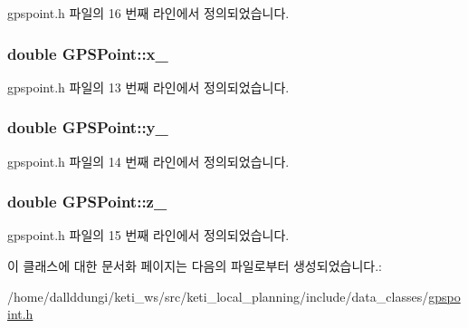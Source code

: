 gpspoint.\+h 파일의 16 번째 라인에서 정의되었습니다.

\subsubsection[{\texorpdfstring{x\+\_\+}{x_}}]{\setlength{\rightskip}{0pt plus 5cm}double G\+P\+S\+Point\+::x\+\_\+}\hypertarget{class_g_p_s_point_ad4b7325afe1ca0fcf8d2ef284ab9b62c}{}\label{class_g_p_s_point_ad4b7325afe1ca0fcf8d2ef284ab9b62c}


gpspoint.\+h 파일의 13 번째 라인에서 정의되었습니다.

\subsubsection[{\texorpdfstring{y\+\_\+}{y_}}]{\setlength{\rightskip}{0pt plus 5cm}double G\+P\+S\+Point\+::y\+\_\+}\hypertarget{class_g_p_s_point_ad41d0e7a93f8766181402ce25af798fe}{}\label{class_g_p_s_point_ad41d0e7a93f8766181402ce25af798fe}


gpspoint.\+h 파일의 14 번째 라인에서 정의되었습니다.

\subsubsection[{\texorpdfstring{z\+\_\+}{z_}}]{\setlength{\rightskip}{0pt plus 5cm}double G\+P\+S\+Point\+::z\+\_\+}\hypertarget{class_g_p_s_point_aa6622ef5c0c58fa1b59c1d5b77fe020c}{}\label{class_g_p_s_point_aa6622ef5c0c58fa1b59c1d5b77fe020c}


gpspoint.\+h 파일의 15 번째 라인에서 정의되었습니다.



이 클래스에 대한 문서화 페이지는 다음의 파일로부터 생성되었습니다.\+:\begin{DoxyCompactItemize}
\item 
/home/dallddungi/keti\+\_\+ws/src/keti\+\_\+local\+\_\+planning/include/data\+\_\+classes/\hyperlink{gpspoint_8h}{gpspoint.\+h}\end{DoxyCompactItemize}
